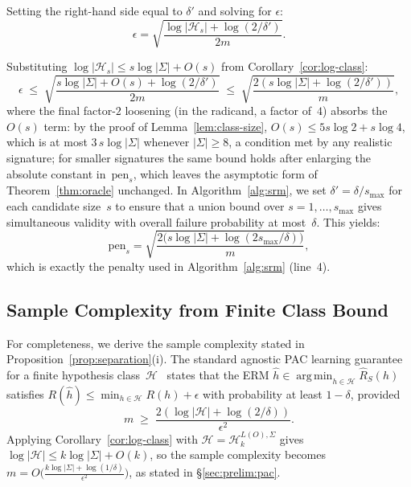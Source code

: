 \documentclass[accepted]{uai2026} %
\theoremstyle{definition}
\theoremstyle{remark}
\DeclareMathOperator*{\argmin}{arg\,min}
\begin{document}
Setting the right-hand side equal to $\delta'$
and solving for $\epsilon$:
\[
  \epsilon
  = \sqrt{\frac{\log|\mathcal{H}_s| + \log(2/\delta')}{2m}}.
\]

Substituting $\log|\mathcal{H}_s| \leq
s\log|\Sigma| + O(s)$ from Corollary~\ref{cor:log-class}:
\[
  \epsilon
  \;\leq\; \sqrt{\frac{s\log|\Sigma| + O(s) + \log(2/\delta')}{2m}}
  \;\leq\; \sqrt{\frac{2(s\log|\Sigma| + \log(2/\delta'))}{m}},
\]
where the final factor-$2$ loosening (in the
radicand, a factor of~$4$) absorbs the $O(s)$ term: by the proof
of Lemma~\ref{lem:class-size}, $O(s) \leq 5s\log 2 + s \log 4$,
which is at most $3\,s\log|\Sigma|$ whenever $|\Sigma| \geq 8$, a
condition met by any realistic signature; for smaller signatures
the same bound holds after enlarging the absolute constant
in~$\mathrm{pen}_s$, which leaves the asymptotic form of
Theorem~\ref{thm:oracle} unchanged.
In Algorithm~\ref{alg:srm}, we set $\delta' = \delta/s_{\max}$ for
each candidate size~$s$ to ensure
that a union bound over $s = 1, \ldots, s_{\max}$ gives
simultaneous validity with overall failure probability at
most~$\delta$.  This yields:
\[
  \mathrm{pen}_s
  = \sqrt{\frac{2\bigl(s\log|\Sigma| +
  \log(2s_{\max}/\delta)\bigr)}{m}},
\]
which is exactly the penalty used in
Algorithm~\ref{alg:srm} (line~4).

\subsection{Sample Complexity from Finite Class
  Bound}\label{app:sample}

For completeness, we derive the sample complexity
stated in Proposition~\ref{prop:separation}(i).  The standard
agnostic PAC learning guarantee for a finite hypothesis
class~$\mathcal{H}$~\citep{DBLP:books/daglib/0033642} states
that the ERM $\hat{h} \in \argmin_{h \in \mathcal{H}}
\hat{R}_S(h)$ satisfies $R(\hat{h}) \leq \min_{h \in
\mathcal{H}} R(h) + \epsilon$ with probability at least
$1 - \delta$, provided
\[
  m \;\geq\; \frac{2(\log|\mathcal{H}| +
  \log(2/\delta))}{\epsilon^2}.
\]
Applying Corollary~\ref{cor:log-class} with
$\mathcal{H} = \mathcal{H}_k^{L(O),\Sigma}$ gives
$\log|\mathcal{H}| \leq k\log|\Sigma| + O(k)$, so the sample
complexity becomes
$m = O\bigl(\frac{k\log|\Sigma| +
\log(1/\delta)}{\epsilon^2}\bigr)$,
as stated in \S\ref{sec:prelim:pac}.

\end{document}
